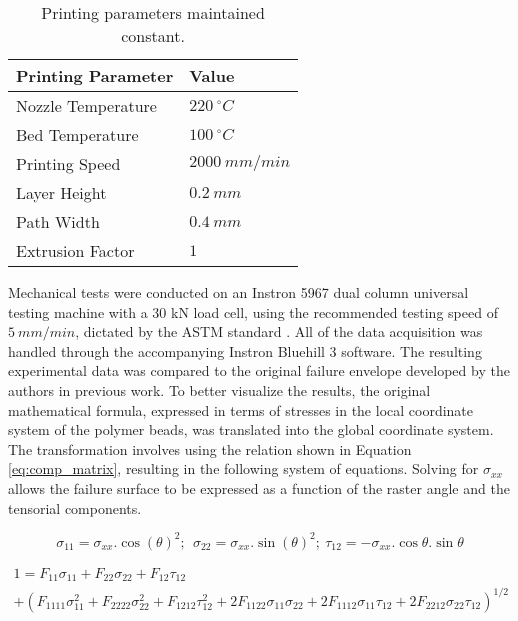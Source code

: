 \documentclass[main.tex]{subfiles}
\begin{document}
\begin{table}[!htbp] 
	\renewcommand{\arraystretch}{1.5}
	\centering
	\caption{Printing parameters maintained constant.}
	\begin{tabular}{C C} 
		\toprule
		\textbf{Printing Parameter} & \textbf{Value}\\
		\midrule
		Nozzle Temperature & $220\ ^\circ C$ \\
		Bed Temperature & $100\ ^\circ C$\\
		Printing Speed & $2000 \  mm/min$\\
		Layer Height & $0.2\  mm$\\
		Path Width & $0.4\  mm$\\
		Extrusion Factor & $1$\\
		\bottomrule
	\end{tabular}
	\label{tab:printparam_ssic}
\end{table}

Mechanical tests were conducted on an Instron 5967 dual column universal testing machine with a 30 kN load cell, using the recommended testing speed of $5\ mm/min$, dictated by the ASTM standard \cite{ASTMD638}. All of the data acquisition was handled through the accompanying Instron Bluehill 3 software. The resulting experimental data was compared to the original failure envelope developed by the authors in previous work. To better visualize the results, the original mathematical formula, expressed in terms of stresses in the local coordinate system of the polymer beads, was translated into the global coordinate system. The transformation involves using the relation shown in Equation \ref{eq:comp_matrix}, resulting in the following system of equations. Solving for $\sigma_{xx}$ allows the failure surface to be expressed as a function of the raster angle and the tensorial components. 

\begin{equation}
	\sigma_{11}=\sigma_{xx}.{\cos{\left(\theta\right)}}^2;\ \ \sigma_{22}=\sigma_{xx}.{\sin{\left(\theta\right)}}^2;\ \tau_{12}=-\sigma_{xx}.\cos{\theta.\sin{\theta}}
\end{equation}

\begin{equation}
	\begin{split}
		1=F_{11}\sigma_{11}+F_{22}\sigma_{22}+F_{12}\tau_{12}\\ +\left(F_{1111}\sigma_{11}^2+F_{2222}\sigma_{22}^2+F_{1212}\tau_{12}^2+2F_{1122}\sigma_{11}\sigma_{22}+2F_{1112}\sigma_{11}\tau_{12}+2F_{2212}\sigma_{22}\tau_{12}\right)^{1/2}
	\end{split}
\end{equation}
\end{document}
